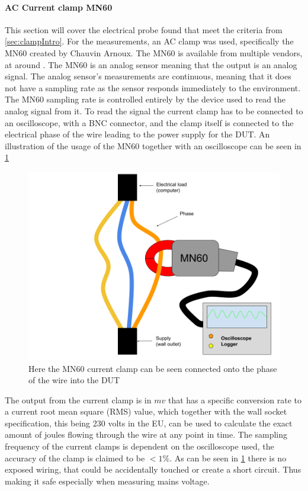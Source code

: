 \paragraph*{AC Current clamp MN60}

This section will cover the electrical probe found that meet the criteria from \ref{sec:clampIntro}. For the measurements, an AC clamp was used, specifically the MN60 created by Chauvin Arnoux\cite*{ChauvinArnoux}. The MN60 is available from multiple vendors, at around . The MN60 is an analog sensor meaning that the output is an analog signal. The analog sensor's measurements are continuous, meaning that it does not have a sampling rate as the sensor responds immediately to the environment\cite{agarwal2005foundations}. The MN60 sampling rate is controlled entirely by the device used to read the analog signal from it\cite{agarwal2005foundations}. To read the signal the current clamp has to be connected to an oscilloscope, with a BNC connector\cite{ClampDoc}, and the clamp itself is connected to the electrical phase of the wire leading to the power supply for the DUT. An illustration of the usage of the MN60 together with an oscilloscope can be seen in \cref{fig:clampSetup}

\begin{figure}[ht]
    \centering
    \includegraphics*[scale=0.25]{figures/CLAMP.png}
    \caption{Here the MN60 current clamp can be seen connected onto the phase of the wire into the DUT}
    \label{fig:clampSetup}
\end{figure}

The output from the current clamp is in $mv$ that has a specific conversion rate to a current root mean square (RMS) value, which together with the wall socket specification, this being 230 volts in the EU\cite{sik}, can be used to calculate the exact amount of joules flowing through the wire at any point in time. The sampling frequency of the current clamps is dependent on the oscilloscope used, the accuracy of the clamp is claimed to be $<1\%$\cite{ClampDoc}. As can be seen in \ref{fig:clampSetup} there is no exposed wiring, that could be accidentally touched or create a short circuit. Thus making it safe especially when measuring mains voltage.


